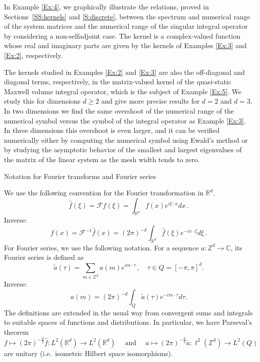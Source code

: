 \documentclass[12pt]{amsart}
\makeatletter
\def\subsection{\@startsection{section}{1}%
  \z@{1.2\linespacing\@plus\linespacing}{.5\linespacing}%
  {\normalfont\scshape\centering}}
\def\subsection{\@startsection{subsection}{2}%
  \z@{0.9\linespacing\@plus.7\linespacing}{-.5em}%
  {\normalfont\bfseries}}
\theoremstyle{definition}
\theoremstyle{remark}
\numberwithin{equation}{section}
\newcommand\C{{\mathbb C}}
\newcommand\R{{\mathbb R}}
\newcommand\Z{{\mathbb Z}}
\newcommand{\sF}{{\mathscr F}}
\let\hat=\widehat
\makeatother
\begin{document}
In Example \ref{Ex:4}, we graphically illustrate the relations, proved in Sections~\ref{SS:kernels} and \ref{S:discrete},
 between the spectrum and numerical range of the system matrices and the numerical range of the singular integral operator by considering a non-selfadjoint case. The kernel is a complex-valued function whose real and imaginary parts are given by the kernels of Examples \ref{Ex:3} and \ref{Ex:2}, respectively. 
 
The kernels studied in Examples \ref{Ex:2} and \ref{Ex:3} are also the off-diagonal and diagonal terms, respectively, in the matrix-valued kernel of the quasi-static Maxwell volume integral operator, which is the subject of Example \ref{Ex:5}. We study this for dimensions $d\ge2$ and give more precise results for $d=2$ and $d=3$. In two dimensions we find the same overshoot of the numerical range of the numerical symbol versus the symbol of the integral operator as Example \ref{Ex:3}. In three dimensions this overshoot is even larger, and it can be verified numerically either by computing the numerical symbol using Ewald's method or by studying the asymptotic behavior of the smallest and largest eigenvalues of the matrix of the linear system as the mesh width tends to zero.   


\subsection{Notation for Fourier transforms and Fourier series}\label{SS:notation}\ 

We use the following convention for the Fourier transformation in $\R^{d}$.
\begin{equation}
\label{E:FT}
\hat{f}(\xi)=\sF f(\xi)=\int_{\R^{d}}f(x)e^{i\xi\cdot x}dx\,.
\end{equation}
Inverse: 
\begin{equation}
\label{E:FTinv} 
f(x) = \sF^{-1}\hat{f}(x)=(2\pi)^{-d}\int_{\R^{d}}\hat f(\xi)e^{-ix\cdot \xi}d\xi\,.
\end{equation}
For Fourier series, we use the following notation.
For a sequence $a:\Z^{d}\to\C$, its Fourier series is defined as
\begin{equation}
\label{E:FS}
\tilde a(\tau) = \sum_{m\in\Z^{d}}a(m) e^{im\cdot \tau}\,,\quad
\tau \in Q=[-\pi,\pi]^{d} .
\end{equation}
Inverse:
\begin{equation}
\label{E:FSinv}
a(m) = (2\pi)^{-d}\int_{Q}\tilde a(\tau) e^{-im\cdot \tau}d\tau.
\end{equation}
The definitions are extended in the usual way from convergent sums and integrals to suitable spaces of functions and distributions. In particular, we have Parseval's theorem
\begin{equation}
\label{E:Parseval}
f\mapsto (2\pi)^{-\frac d2}\hat{f}: L^{2}(\R^{d}) \to L^{2}(\R^{d}) 
\quad\mbox{ and }\quad
a\mapsto (2\pi)^{-\frac d2}\tilde{a}: \ell^{2}(\Z^{d}) \to L^{2}(Q) 
\end{equation}
are unitary (i.e.\ isometric Hilbert space isomorphisms).
\end{document}
